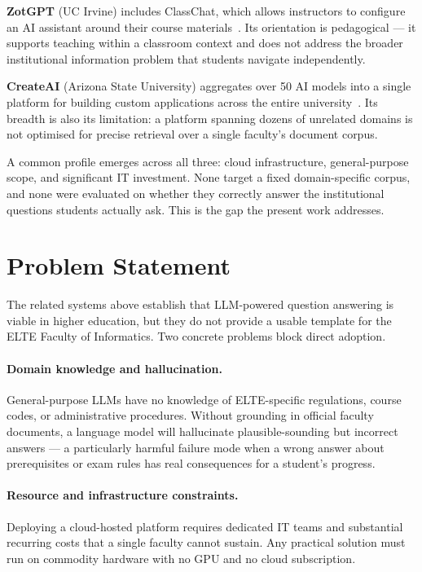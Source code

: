 \textbf{ZotGPT} (UC Irvine) includes ClassChat, which allows instructors to
configure an AI assistant around their course materials~\cite{uci_zotgpt}.
Its orientation is pedagogical --- it supports teaching within a classroom
context and does not address the broader institutional information problem
that students navigate independently.

\textbf{CreateAI} (Arizona State University) aggregates over 50 AI models
into a single platform for building custom applications across the entire
university~\cite{asu_createai}. Its breadth is also its limitation: a
platform spanning dozens of unrelated domains is not optimised for precise
retrieval over a single faculty's document corpus.

A common profile emerges across all three: cloud infrastructure,
general-purpose scope, and significant IT investment. None target a fixed
domain-specific corpus, and none were evaluated on whether they correctly
answer the institutional questions students actually ask. This is the gap
the present work addresses.

\section{Problem Statement}
\label{sec:intro-problem}

The related systems above establish that LLM-powered question answering is
viable in higher education, but they do not provide a usable template for
the ELTE Faculty of Informatics. Two concrete problems block direct adoption.

\paragraph{Domain knowledge and hallucination.}
General-purpose LLMs have no knowledge of ELTE-specific regulations, course
codes, or administrative procedures. Without grounding in official faculty
documents, a language model will hallucinate plausible-sounding but incorrect
answers --- a particularly harmful failure mode when a wrong answer about
prerequisites or exam rules has real consequences for a student's progress.

\paragraph{Resource and infrastructure constraints.}
Deploying a cloud-hosted platform requires dedicated IT teams and substantial
recurring costs that a single faculty cannot sustain. Any practical solution
must run on commodity hardware with no GPU and no cloud subscription.

